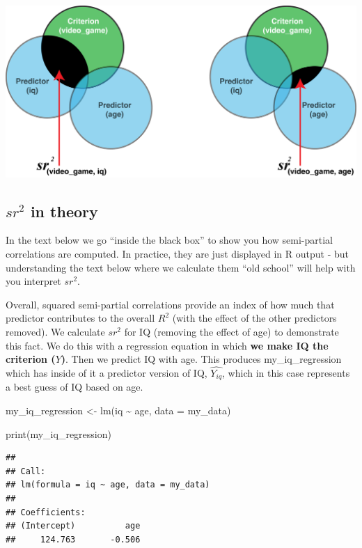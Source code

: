 \documentclass[
]{krantz}
\makeatletter
\newenvironment{Shaded}{\begin{snugshade}}{\end{snugshade}}
\newcommand{\AttributeTok}[1]{\textcolor[rgb]{0.61,0.61,0.61}{#1}}
\newcommand{\FunctionTok}[1]{\textcolor[rgb]{0,0,0}{#1}}
\newcommand{\NormalTok}[1]{#1}
\newcommand{\OtherTok}[1]{\textcolor[rgb]{0.37,0.37,0.37}{#1}}
\newcommand{\SpecialCharTok}[1]{\textcolor[rgb]{0,0,0}{#1}}
\newenvironment{kframe}{%
\medskip{}
\setlength{\fboxsep}{.8em}
 \def\at@end@of@kframe{}%
 \ifinner\ifhmode%
  \def\at@end@of@kframe{\end{minipage}}%
  \begin{minipage}{\columnwidth}%
 \fi\fi%
 \def\FrameCommand##1{\hskip\@totalleftmargin \hskip-\fboxsep
 \colorbox{shadecolor}{##1}\hskip-\fboxsep
     \hskip-\linewidth \hskip-\@totalleftmargin \hskip\columnwidth}%
 \MakeFramed {\advance\hsize-\width
   \@totalleftmargin\z@ \linewidth\hsize
   \@setminipage}}%
 {\par\unskip\endMakeFramed%
 \at@end@of@kframe}
\renewenvironment{Shaded}{\begin{kframe}}{\end{kframe}}
\makeatother
\begin{document}
\includegraphics[width=0.63\linewidth]{ch_multiple_regression/images/mr_venn_sr}

\hypertarget{sr2-in-theory}{%
\subsection{\texorpdfstring{\(sr^2\) in theory}{sr\^{}2 in theory}}\label{sr2-in-theory}}

In the text below we go ``inside the black box'' to show you how semi-partial correlations are computed. In practice, they are just displayed in R output - but understanding the text below where we calculate them ``old school'' will help with you interpret \(sr^2\).

Overall, squared semi-partial correlations provide an index of how much that predictor contributes to the overall \(R^2\) (with the effect of the other predictors removed). We calculate \(sr^2\) for IQ (removing the effect of age) to demonstrate this fact. We do this with a regression equation in which \textbf{we make IQ the criterion (\(Y\))}. Then we predict IQ with age. This produces my\_iq\_regression which has inside of it a predictor version of IQ, \(\widehat{Y_{iq}}\), which in this case represents a best guess of IQ based on age.

\begin{Shaded}
\begin{Highlighting}[]
\NormalTok{my\_iq\_regression }\OtherTok{\textless{}{-}} \FunctionTok{lm}\NormalTok{(iq }\SpecialCharTok{\textasciitilde{}}\NormalTok{ age, }\AttributeTok{data =}\NormalTok{ my\_data)}

\FunctionTok{print}\NormalTok{(my\_iq\_regression)}
\end{Highlighting}
\end{Shaded}

\begin{verbatim}
## 
## Call:
## lm(formula = iq ~ age, data = my_data)
## 
## Coefficients:
## (Intercept)          age  
##     124.763       -0.506
\end{verbatim}
\end{document}
